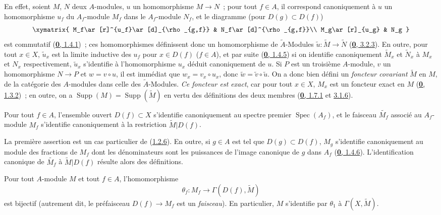 En effet, soient $M$, $N$ deux $A$-modules, $u$ un homomorphisme
$M\to N$~; pour tout $f\in A$, il correspond canoniquement à $u$ un
homomorphisme $u_f$ du $A_f$-module $M_f$ dans le $A_f$-module $N_f$, et le
diagramme (pour $D(g)\subset D(f)$)
\[
  \xymatrix{
    M_f\ar[r]^{u_f}\ar[d]_{\rho_{g,f}} & N_f\ar[d]^{\rho_{g,f}}\\
    M_g\ar[r]_{u_g} & N_g
  }
\]
est commutatif (\hyperref[0.1.4.1-fr]{\textbf{0}, 1.4.1})~; ces homomorphismes
définissent donc un homomorphisme de $\widetilde{A}$-Modules
$\widetilde{u}:\widetilde{M}\to\widetilde{N}$
(\hyperref[0.3.2.3-fr]{\textbf{0}, 3.2.3}). En outre, pour tout $x\in X$,
$\widetilde{u}_x$ est la limite inductive des $u_f$ pour $x\in D(f)$
($f\in A$), et par suite (\hyperref[0.1.4.5-fr]{\textbf{0}, 1.4.5}) si on identifie
canoniquement $\widetilde{M}_x$ et $\widetilde{N}_x$ à $M_x$ et $N_x$
respectivement, $\widetilde{u}_x$ s'identifie à l'homomorphisme $u_x$ déduit
canoniquement de $u$. Si $P$ est un troisième $A$-module, $v$ un
homomorphisme $N\to P$ et $w=v\circ u$, il est immédiat que
$w_x=v_x\circ u_x$, donc $\widetilde{w}=\widetilde{v}\circ\widetilde{u}$. On
a donc bien défini un \emph{foncteur covariant} $\widetilde{M}$ en $M$, de la
catégorie des $A$-modules dans celle des $\widetilde{A}$-Modules. \emph{Ce
foncteur est exact}, car pour tout $x\in X$, $M_x$ est un foncteur exact en
$M$ (\hyperref[0.1.3.2-fr]{\textbf{0}, 1.3.2})~; en outre, on a
$\operatorname{Supp}(M)=\operatorname{Supp}(\widetilde{M})$ en vertu des
définitions des deux membres (\hyperref[0.1.7.1-fr]{\textbf{0}, 1.7.1} et
\hyperref[0.3.1.6-fr]{3.1.6}).

\begin{proposition}[1.3.6]
\label{I.1.3.6-fr}
Pour tout $f\in A$, l'ensemble ouvert $D(f)\subset X$ s'identifie
canoniquement au spectre premier $\operatorname{Spec}(A_f)$, et le faisceau
$\widetilde{M_f}$ associé au $A_f$-module $M_f$ s'identifie canoniquement à
la restriction $\widetilde{M}|D(f)$.
\end{proposition}

La première assertion est un cas particulier de
(\hyperref[I.1.2.6-fr]{1.2.6}). En outre, si $g\in A$ est tel que
$D(g)\subset D(f)$, $M_g$ s'identifie canoniquement au module des fractions
de $M_f$ dont les dénominateurs sont les puissances de l'image canonique de
$g$ dans $A_f$ (\hyperref[0.1.4.6-fr]{\textbf{0}, 1.4.6}). L'identification canonique
de $\widetilde{M_f}$ à $\widetilde{M}|D(f)$ résulte alors des définitions.

\begin{theorem}[1.3.7]
\label{I.1.3.7-fr}
Pour tout $A$-module $M$ et tout $f\in A$, l'homomorphisme
\[
  \theta_f:M_f\longrightarrow\Gamma(D(f),\widetilde{M})
\]
est bijectif \textup{(autrement dit, le préfaisceau $D(f)\to M_f$ est un
\emph{faisceau})}. En particulier, $M$ s'identifie par $\theta_1$ à
$\Gamma(X,\widetilde{M})$.
\end{theorem}

